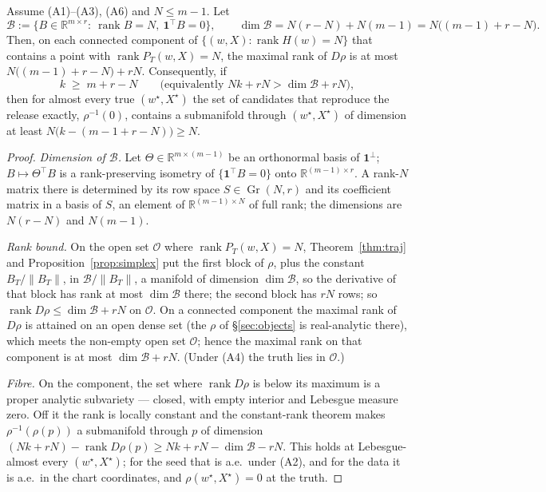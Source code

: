 \begin{theorem}\label{thm:cap}
Assume (A1)--(A3), (A6) and $N\le m-1$. Let
\[
  \mathcal B:=\{B\in\mathbb R^{m\times r}:\ \operatorname{rank}B=N,\ \mathbf 1^{\!\top}B=0\},
  \qquad \dim\mathcal B=N(r-N)+N(m-1)=N\bigl((m-1)+r-N\bigr).
\]
Then, on each connected component of $\{(w,X):\operatorname{rank}H(w)=N\}$
that contains a point with $\operatorname{rank}P_T(w,X)=N$, the maximal rank
of $D\rho$ is at most $N\bigl((m-1)+r-N\bigr)+rN$. Consequently, if
\begin{equation}\label{eq:cap}
  k\;\ge\;m+r-N\qquad\bigl(\text{equivalently } Nk+rN>\dim\mathcal B+rN\bigr),
\end{equation}
then for almost every true $(w^\star,X^\star)$ the set of candidates that
reproduce the release exactly, $\rho^{-1}(0)$, contains a submanifold through
$(w^\star,X^\star)$ of dimension at least $N\bigl(k-(m-1+r-N)\bigr)\ge N$.
\end{theorem}
\begin{proof}
\emph{Dimension of $\mathcal B$.} Let $\Theta\in\mathbb R^{m\times(m-1)}$ be
an orthonormal basis of $\mathbf 1^\perp$; $B\mapsto\Theta^{\!\top}B$ is a
rank-preserving isometry of $\{\mathbf 1^{\!\top}B=0\}$ onto
$\mathbb R^{(m-1)\times r}$. A rank-$N$ matrix there is determined by its row
space $S\in\operatorname{Gr}(N,r)$ and its coefficient matrix in a basis of
$S$, an element of $\mathbb R^{(m-1)\times N}$ of full rank; the dimensions
are $N(r-N)$ and $N(m-1)$.

\emph{Rank bound.} On the open set $\mathcal O$ where
$\operatorname{rank}P_T(w,X)=N$, Theorem~\ref{thm:traj} and
Proposition~\ref{prop:simplex} put the first block of $\rho$, plus the
constant $B_T/\|B_T\|$, in $\mathcal B/\|B_T\|$, a manifold of dimension
$\dim\mathcal B$, so the derivative of that block has rank at most
$\dim\mathcal B$ there; the second block has $rN$ rows; so
$\operatorname{rank}D\rho\le\dim\mathcal B+rN$ on $\mathcal O$. On a
connected component the maximal rank of $D\rho$ is attained on an open dense
set (the $\rho$ of \S\ref{sec:objects} is real-analytic there), which meets
the non-empty open set $\mathcal O$; hence the maximal rank on that component
is at most $\dim\mathcal B+rN$. (Under (A4) the truth lies in $\mathcal O$.)

\emph{Fibre.} On the component, the set where $\operatorname{rank}D\rho$ is
below its maximum is a proper analytic subvariety — closed, with empty
interior and Lebesgue measure zero. Off it the rank is locally constant and
the constant-rank theorem makes $\rho^{-1}(\rho(p))$ a submanifold through
$p$ of dimension $(Nk+rN)-\operatorname{rank}D\rho(p)\ge Nk+rN-\dim\mathcal
B-rN$. This holds at Lebesgue-almost every $(w^\star,X^\star)$; for the seed
that is a.e.\ under (A2), and for the data it is a.e.\ in the chart
coordinates, and $\rho(w^\star,X^\star)=0$ at the truth.
\end{proof}

